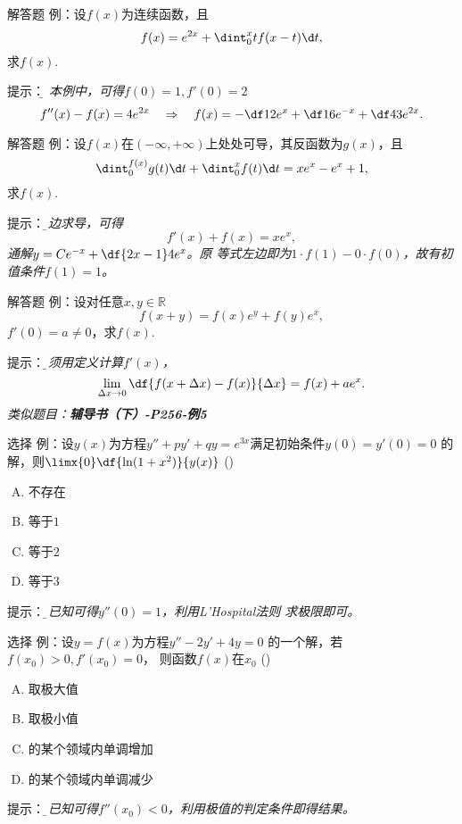 \begin{frame}{解答题}
	\linespread{1.2}
	\alert{例：}设$f(x)$为连续函数，且
	$$f(x)=e^{2x}+\dint_0^xtf(x-t)\d t,$$
	求$f(x)$.
	
	\pause\alert{提示：}\it\b {}
	\pause 本例中，可得$f(0)=1,f'(0)=2$\pause  
	$$f''(x)-f(x)=4e^{2x}\quad\Rightarrow\quad 
	f(x)=-\df12e^x+\df16e^{-x}+\df43e^{2x}.$$
\end{frame}

\begin{frame}{解答题}
	\linespread{1.2}
	\alert{例：}设$f(x)$在$(-\infty,+\infty)$上处处可导，其反函数为$g(x)$，且
	$$\dint_0^{f(x)}g(t)\d t+\dint_0^xf(t)\d t=xe^x-e^x+1,$$
	求$f(x)$.
	
	\pause\alert{提示：}\it\b 两边求导，可得
	$$f'(x)+f(x)=xe^x,$$
	通解$y=Ce^{-x}+\df{2x-1}4e^x$。\pause 原
	等式左边即为$1\cdot f(1)-0\cdot f(0)$，故有初值条件$f(1)=1$。
\end{frame}

\begin{frame}{解答题}
	\linespread{1.2}
	\alert{例：}设对任意$x,y\in\mathbb{R}$
	$$f(x+y)=f(x)e^y+f(y)e^x,$$
	$f'(0)=a\ne 0$，求$f(x)$.
	
	\pause\alert{提示：}\it\b 必须用定义计算$f'(x)$，
	$$\lim\limits_{\Delta x\to 0}\df{f(x+\Delta x)-f(x)}{\Delta x}
	=f(x)+ae^x.$$
	\pause 类似题目：\alert{\bf 辅导书（下）-P256-例5}
\end{frame}

\begin{frame}{选择}
	\linespread{1.3}
	\alert{例：}设$y(x)$为方程$y''+py'+qy=e^{3x}$满足初始条件$y(0)=y'(0)=0$
	的解，则$\limx{0}\df{\ln(1+x^2)}{y(x)}$
	(\underline{\;})
	\begin{enumerate}[(A)]
	  \item 不存在
	  \item 等于$1$
	  \item 等于$2$
	  \item 等于$3$
	\end{enumerate}
	\pause\alert{提示：}\it\b 由已知可得$y''(0)=1$，利用L'Hospital法则
	求极限即可。
\end{frame}

\begin{frame}{选择}
	\linespread{1.3}
	\alert{例：}设$y=f(x)$为方程$y''-2y'+4y=0$
	的一个解，若$f(x_0)>0,f'(x_0)=0$，
	则函数$f(x)$在$x_0$
	(\underline{\;})
	\begin{enumerate}[(A)]
	  \item 取极大值
	  \item 取极小值
	  \item 的某个领域内单调增加
	  \item 的某个领域内单调减少
	\end{enumerate}
	\pause\alert{提示：}\it\b 由已知可得$f''(x_0)<0$，利用极值的判定条件即得结果。
\end{frame}

